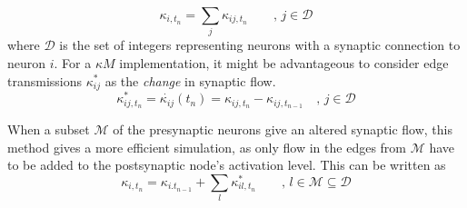 \begin{equation}
	\kappa_{i, t_n} = \sum_j \kappa_{ij, t_n} \qquad, \, j\in \mathcal{D}
	\nonumber
\end{equation}
		where $\mathcal{D}$ is the set of integers representing neurons with a synaptic connection to neuron $i$.
		For a $\kappa M$ implementation, it might be advantageous to consider edge transmissions $\kappa_{ij}^*$ as the \emph{change} in synaptic flow. %
\begin{equation}
	\kappa_{ij,t_n}^* = \dot{\kappa_{ij}}(t_n) = \kappa_{ij,t_{n}} - \kappa_{ij,t_{n-1}} \quad, \, j\in \mathcal{D}
\end{equation}
		
		When a subset $\mathcal{M}$ of the presynaptic neurons give an altered synaptic flow, this method gives a more efficient simulation,
			as only flow in the edges from $\mathcal{M}$ have to be added to the postsynaptic node's activation level.
		This can be written as
\begin{equation}
	\kappa_{i, t_n} = \kappa_{i. t_{n-1}} + \sum_l \kappa_{il, t_n}^* \qquad,\, l\in \mathcal{M} \subseteq \mathcal{D}
\end{equation}

